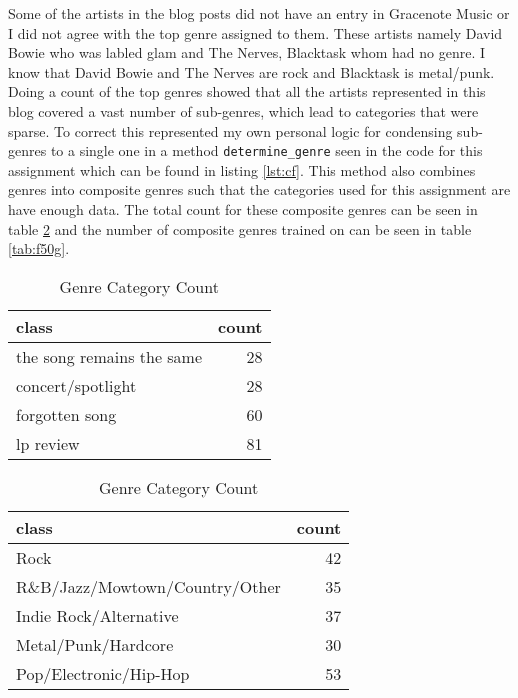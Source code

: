 \documentclass[letterpaper,10pt]{article}
\begin{document}
Some of the artists in the blog posts did not have an entry in Gracenote Music or I did not agree with the top genre assigned to them. These artists namely David Bowie who was labled glam and The Nerves, Blacktask whom had no genre. I know that David Bowie and The Nerves are rock and Blacktask is metal/punk. Doing a count of the top genres showed that all the artists represented in this blog covered a vast number of sub-genres, which lead to categories that were sparse. To correct this represented my own personal logic for condensing sub-genres to a single one in a method \verb+determine_genre+ seen in the code for this assignment which can be found in listing \hyperref[lst:cf]{\ref{lst:cf}}. This method also combines genres into composite genres such that the categories used for this assignment are have enough data. The total count for these composite genres can be seen in table \hyperref[tab:GenreTotalCount]{\ref{tab:GenreTotalCount}} and the number of composite genres trained on can be seen in table \hyperref[tab:f50g]{\ref{tab:f50g}}.

\begin{table}[H]
\centering
\setlength\tabcolsep{4pt}
\begin{minipage}{0.48\textwidth}
\centering
\begin{tabular}{lr}
\hline
 class                     &   count \\
\hline
 the song remains the same &           28 \\
 concert/spotlight         &           28 \\
 forgotten song            &           60 \\
 lp review                 &           81 \\
\hline
\end{tabular}
\caption{Blog Structure Count}
\label{tab:BlogSTotalCount} 
\end{minipage}%
\hfill
\begin{minipage}{0.48\textwidth}
\centering
\begin{tabular}{lr}
\hline
 class                          &   count \\
\hline
 Rock                           &           42 \\
 R\&B/Jazz/Mowtown/Country/Other &           35 \\
 Indie Rock/Alternative         &           37 \\
 Metal/Punk/Hardcore            &           30 \\
 Pop/Electronic/Hip-Hop         &           53 \\
\hline
\end{tabular}
 \caption{Genre Category Count} 
 \label{tab:GenreTotalCount} 
\end{minipage}
\end{table}
\newpage
\clearpage
\end{document}
